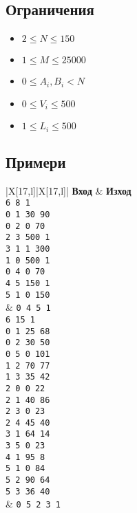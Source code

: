 \documentclass[12pt]{article}
\begin{document}
\subsection{Ограничения}

\vspace{0.1em}
\begin{itemize}
	\item $2 \leq N \leq 150$
    \item $1 \leq M \leq 25000$
	\item $0 \leq A_i, B_i < N$
    \item $0 \leq V_i \leq 500$
    \item $1 \leq L_i \leq 500$
\end{itemize}

\subsection{Примери}

\begin{table}[ht]
	\begin{tblr}{|X[17,l]|X[17,l]|}
		\hline
		\textbf{Вход} & \textbf{Изход}\\
		\hline
        \texttt{6 8 1\\
                    0 1 30 90\\
                    0 2 0 70\\
                    2 3 500 1\\
                    3 1 1 300\\
                    1 0 500 1\\
                    0 4 0 70\\
                    4 5 150 1\\
                    5 1 0 150\\
                    } & 
            \texttt{0 4 5 1}\\
		\hline
		\texttt{6 15 1\\
                    0 1 25 68\\
                    0 2 30 50\\
                    0 5 0 101\\
                    1 2 70 77\\
                    1 3 35 42\\
                    2 0 0 22\\
                    2 1 40 86\\ 
                    2 3 0 23\\
                    2 4 45 40\\ 
                    3 1 64 14\\
                    3 5 0 23\\
                    4 1 95 8\\
                    5 1 0 84\\
                    5 2 90 64\\
                    5 3 36 40\\
                    } & 
            \texttt{0 5 2 3 1}
		
		\\
		\hline
	\end{tblr}
\end{table}
\end{document}
